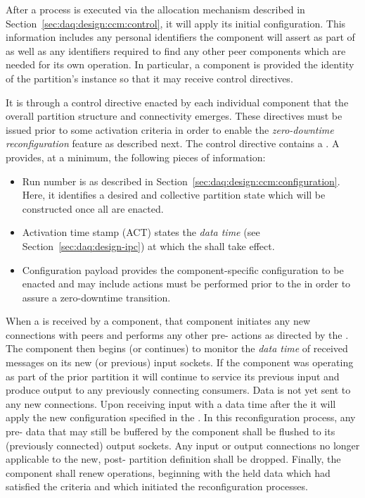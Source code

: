 After a process is executed via the allocation mechanism described in Section~\ref{sec:daq:design:ccm:control}, it will apply its initial configuration. 
This information includes any personal identifiers the component will assert as part of  as well as any identifiers required to find any other peer components which are needed for its own operation. 
In particular, a component is provided the identity of the partition's  instance so that it may receive control directives.

It is through a control directive enacted by each individual component that the overall partition structure and connectivity emerges.  
These directives must be issued prior to some activation criteria in order to enable the \textit{zero-downtime reconfiguration} feature as described next.
The control directive contains a .
A  provides, at a minimum, the following pieces of information:

\begin{itemize}
\item Run number is as described in Section~\ref{sec:daq:design:ccm:configuration}. 
  Here, it identifies a desired and collective partition state which will be constructed once all  are enacted.
\item Activation time stamp (ACT) states the \textit{data time} (see Section~\ref{sec:daq:design-ipc}) at which the  shall take effect. 
\item Configuration payload provides the component-specific configuration to be enacted and may include   actions must be performed prior to the  in order to assure a zero-downtime transition.
\end{itemize}

When a  is received by a component, that component initiates any new connections with peers and performs any other pre- actions as directed by the . 
The component then begins (or continues) to monitor the \textit{data time} of received messages on its new (or previous) input sockets. 
If the component was operating as part of the prior partition it will continue to service its previous input and produce output to any previously connecting consumers.
Data is not yet sent to any new connections.
Upon receiving input with a data time after the  it will apply the new configuration specified in the . 
In this reconfiguration process, any pre- data that may still be buffered by the component shall be flushed to its (previously connected) output sockets. 
Any input or output connections no longer applicable to the new, post- partition definition shall be dropped. 
Finally, the component shall renew operations, beginning with the held data which had satisfied the  criteria and which initiated the reconfiguration processes.

